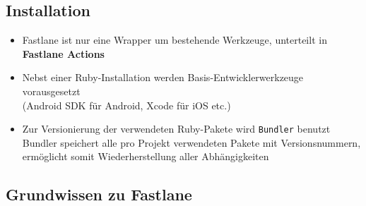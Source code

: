\documentclass[a4paper]{article}
\begin{document}
		\subsection{Installation}
		
		\begin{itemize}
			\item Fastlane ist nur eine Wrapper um bestehende Werkzeuge, unterteilt in \textbf{Fastlane Actions}
			\item Nebst einer Ruby-Installation werden Basis-Entwicklerwerkzeuge vorausgesetzt \\
				(Android SDK für Android, Xcode für iOS etc.)
			\item Zur Versionierung der verwendeten Ruby-Pakete wird \texttt{Bundler} benutzt \\
				Bundler speichert alle pro Projekt verwendeten Pakete mit Versionsnummern, ermöglicht somit Wiederherstellung aller Abhängigkeiten			
		\end{itemize}
	
		\subsection{Grundwissen zu Fastlane}
		
\end{document}
